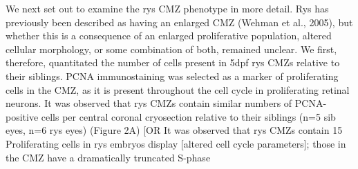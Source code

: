 We next set out to examine the rys CMZ phenotype in more detail. Rys has previously been described as having an enlarged CMZ (Wehman et al., 2005), but whether this is a consequence of an enlarged proliferative population, altered cellular morphology, or some combination of both, remained unclear. We first, therefore, quantitated the number of cells present in 5dpf rys CMZs relative to their siblings. PCNA immunostaining was selected as a marker of proliferating cells in the CMZ, as it is present throughout the cell cycle in proliferating retinal neurons. It was observed that rys CMZs contain similar numbers of PCNA-positive cells per central coronal cryosection relative to their siblings (n=5 sib eyes, n=6 rys eyes) (Figure 2A) [OR It was observed that rys CMZs contain 15%
Proliferating cells in rys embryos display [altered cell cycle parameters]; those in the CMZ have a dramatically truncated S-phase
